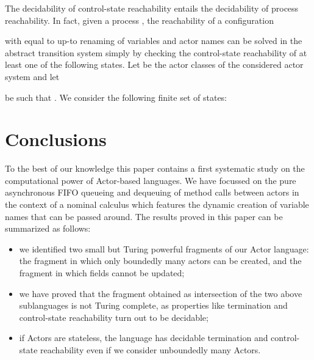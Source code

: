 \documentclass{LMCS}
\theoremstyle{plain}\newtheorem{proposition}[thm]{Proposition}
\theoremstyle{plain}\newtheorem{lemma}[thm]{Lemma}
\theoremstyle{plain}\newtheorem{theorem}[thm]{Theorem}
\theoremstyle{plain}\newtheorem{corollary}[thm]{Corollary}
\newif\ifcamera \camerafalse
\begin{document}
The decidability of control-state reachability entails the decidability of
process reachability.
In fact,
given a process , 
the reachability of a configuration

with  equal to  up-to renaming
 of variables and actor names
can be solved in the abstract transition
system simply by checking the control-state
reachability of at least one 
of the following states.
Let 
be the actor classes of the considered actor system
and let 
 
be such that .
We consider the following finite set of states:

\ifcamera
Note that 
control-state reachability 
is not preserved by the abstract semantics.
In fact, the abstract transition system is guaranteed to 
execute the same method invocations, but this can 
be done in a different order and also by different 
actors.
\else

\fi








 




\section{Conclusions} \label{sec.conclusions}
To the best of our knowledge this paper contains a first systematic study on the computational power of Actor-based languages.
We have focussed on the  pure asynchronous FIFO queueing and dequeuing of method calls between actors in the context of a nominal calculus 
which features the dynamic creation of variable names that can be passed around.
The results proved in this paper can be summarized as follows:
\begin{itemize}
\item
we identified two small but Turing powerful fragments of our Actor language:
the fragment in which only boundedly many actors can be created,
and the fragment in which fields cannot be updated;
\item
we have proved that the fragment obtained as intersection of the 
two above sublanguages is not Turing complete, as properties like
termination and control-state reachability turn out to be decidable;
\item
if Actors are stateless, the language has decidable termination
and control-state reachability even if we consider unboundedly many
Actors. 
\end{itemize}
\end{document}
